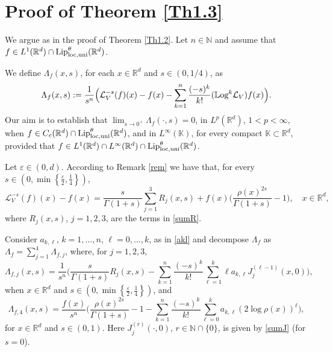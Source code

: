 \documentclass[10pt, a4paper, reqno]{amsart}
\theoremstyle{definition}
\theoremstyle{remark}
\numberwithin{equation}{section}
\begin{document}
\section{Proof of Theorem \ref{Th1.3}}
We argue as in the proof of Theorem \ref{Th1.2}. Let $n\in \mathbb N$ and assume that $f\in L^1(\mathbb R^d)\cap {\textup{Lip}}^\theta _{{\rm loc}, {\rm uni}}(\mathbb R^d)$.

We define $\Lambda_f(x,s)$, for each $x\in \mathbb R^d$ and $s\in (0,1/4)$, as
\[
\Lambda _f(x,s):=\frac{1}{s^n}\Big(\mathcal L_V^{-s}(f)(x)-f(x)-\sum_{k=1}^n\frac{(-s)^k}{k!}(\mathbb{L}\textup{og}^k\mathcal L_V)f(x)\Big).
\]
Our aim is to establish that $\lim_{s\rightarrow 0^+}\Lambda_f(\cdot,s)=0$, in $L^p(\mathbb R^d)$, $1<p<\infty$, when $f\in C_c(\mathbb R^d)\cap {\textup{Lip}}_{\textup{loc},\textup{uni}}^\theta (\mathbb R^d)$, and in $L^\infty (\mathbb K)$, for every compact $\mathbb K\subset \mathbb R^d$, provided that $f\in L^1(\mathbb R^d)\cap L^\infty (\mathbb R^d)\cap {\textup{Lip}}_{\textup{loc},\textup{uni}}^\theta (\mathbb R^d)$. 

Let $\varepsilon \in (0,d)$. According to Remark \ref{rem} we have that, for every $s\in (0,\min\left\{\tfrac{\varepsilon }{2},\tfrac{1}{4}\right\})$,
\[
 \mathcal{L}_V^{-s}(f)(x)-f(x)=\frac{s}{\Gamma (1+s)}\sum_{j=1}^3R_j(x,s)+f(x)\Big(\frac{\rho (x)^{2s}}{\Gamma (1+s)}-1\Big),\quad x\in \mathbb R^d,
\]
where $R_j(x,s)$, $j=1,2,3$, are the terms in \eqref{sumR}. 

Consider $a_{k,\ell}$, $k=1,\ldots, n$, $\ell =0,\ldots, k$, as in \eqref{akl} and decompose $\Lambda _f$ as $\Lambda _f=\sum_{j=1}^4\Lambda _{f,j}$, where, for $j=1,2,3$, 
\[
\Lambda_{f,j}(x,s)=\frac{1}{s^n}\Big(\frac{s}{\Gamma (1+s)}R_j(x,s)-\sum_{k=1}^n\frac{(-s)^k}{k!}\sum_{\ell =1}^k\ell a_{k,\ell}J_j^{(\ell -1)}(x,0)\Big),
\]
when $x\in \mathbb R^d$ and $s\in (0,\min\left\{\tfrac{\varepsilon}{2},\tfrac{1}{4}\right\})$, and
\[
\Lambda_{f,4}(x,s)=\frac{f(x)}{s^n}\Big(\frac{\rho (x)^{2s}}{\Gamma (1+s)}-1-\sum_{k=1}^n\frac{(-s)^k}{k!}\sum_{\ell =0}^ka_{k,\ell}(2\log \rho (x))^\ell \Big),
\]
for $x\in \mathbb R^d$ and $s\in (0,1)$. Here $J_j^{(r)}(\cdot,0)$, $r\in \mathbb N\cap\{0\}$, is given by \eqref{sumJ} (for $s=0$). 
\end{document}
